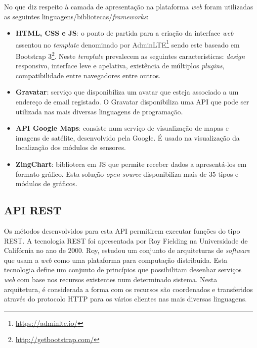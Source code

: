 No que diz respeito à camada de apresentação na plataforma \textit{web} foram utilizadas as seguintes linguagens/bibliotecas/\textit{frameworks}: 

\begin{itemize}
	\item \textbf{\acs{HTML}, \acs{CSS} e \acs{JS}}: o ponto de partida para a criação da interface \textit{web} assentou no \textit{template} denominado por AdminLTE\footnote{\url{https://adminlte.io/}} sendo este baseado em Bootstrap 3\footnote{\url{http://getbootstrap.com/}}. Neste \textit{template} prevalecem as seguintes características:  \textit{design} responsivo, interface leve e apelativa, existência de múltiplos \textit{plugins}, compatibilidade entre navegadores entre outros. 
	
	\item \textbf{Gravatar}: serviço que disponibiliza um avatar que esteja associado a um endereço de email registado. O Gravatar disponibiliza uma \ac{API} que pode ser utilizada nas mais diversas linguagens de programação\cite{gravatar}.
	 
	\item \textbf{\ac{API} Google Maps}: consiste num serviço de visualização de mapas e imagens de satélite, desenvolvido pela Google. É usado na visualização da localização dos módulos de sensores. 
	
	\item \textbf{ZingChart}: biblioteca em \ac{JS} que permite receber dados a apresentá-los em formato gráfico. Esta solução \textit{open-source} disponibiliza mais de 35 tipos e módulos de gráficos. 
\end{itemize}





\subsection{\acs{API} \acs{REST}}


Os métodos desenvolvidos para esta \ac{API} permitirem executar funções do tipo \ac{REST}. A tecnologia \ac{REST} foi apresentada por Roy Fielding na Universidade de Califórnia no ano de 2000. Roy, estudou um conjunto de arquiteturas de \textit{software} que usam a \textit{web} como uma plataforma para computação distribuída\cite{restpaper}. Esta tecnologia define um conjunto de princípios que possibilitam desenhar serviços \textit{web} com base nos recursos existentes num determinado sistema. Nesta arquitetura, é considerada a forma com os recursos são coordenados e transferidos através do protocolo \ac{HTTP} para os vários clientes nas mais diversas linguagens. 


